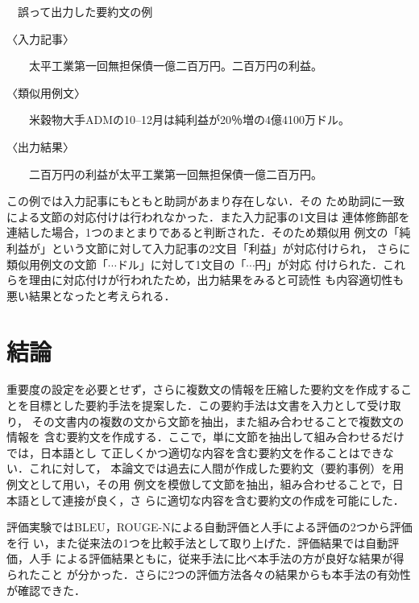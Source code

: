 \documentclass[japanese]{jnlp_1.4}
\newcounter{exp}
\def\exp#1{}
\begin{document}
\begin{screen}
\exp{例:例4}　誤って出力した要約文の例

〈入力記事〉\par
　　太平工業第一回無担保債一億二百万円。二百万円の利益。

〈類似用例文〉\par
　　米穀物大手ADMの10--12月は純利益が20％増の4億4100万ドル。

〈出力結果〉\par
　　二百万円の利益が太平工業第一回無担保債一億二百万円。
\end{screen}
この例では入力記事にもともと助詞があまり存在しない．その
ため助詞に一致による文節の対応付けは行われなかった．また入力記事の1文目は
連体修飾部を連結した場合，1つのまとまりであると判断された．そのため類似用
例文の「純利益が」という文節に対して入力記事の2文目「利益」が対応付けられ，
さらに類似用例文の文節「$\cdots$ドル」に対して1文目の「$\cdots$円」が対応
付けられた．これらを理由に対応付けが行われたため，出力結果をみると可読性
も内容適切性も悪い結果となったと考えられる．





\section{結論}

重要度の設定を必要とせず，さらに複数文の情報を圧縮した要約文を作成するこ
とを目標とした要約手法を提案した．この要約手法は文書を入力として受け取り，
その文書内の複数の文から文節を抽出，また組み合わせることで複数文の情報を
含む要約文を作成する．ここで，単に文節を抽出して組み合わせるだけでは，日本語とし
て正しくかつ適切な内容を含む要約文を作ることはできない．これに対して，
本論文では過去に人間が作成した要約文（要約事例）を用例文として用い，その用
例文を模倣して文節を抽出，組み合わせることで，日本語として連接が良く，さ
らに適切な内容を含む要約文の作成を可能にした．

評価実験ではBLEU，ROUGE-Nによる自動評価と人手による評価の2つから評価を行
い，また従来法の1つを比較手法として取り上げた．評価結果では自動評価，人手
による評価結果ともに，従来手法に比べ本手法の方が良好な結果が得られたこと
が分かった．さらに2つの評価方法各々の結果からも本手法の有効性が確認できた．

\def\labelenumi{}
\end{document}
